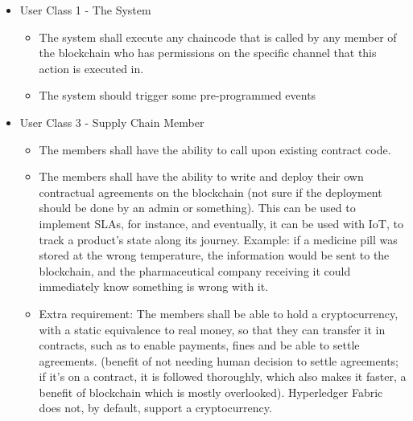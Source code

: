     \begin{itemize}
        \item User Class 1 - The System
            \begin{itemize}
			\item The system shall execute any chaincode that is called by any member of the blockchain who has permissions on the specific channel that this action is executed in.
            \item The system should trigger some pre-programmed events
            \end{itemize}
        \item User Class 3 - Supply Chain Member
            \begin{itemize}
			\item The members shall have the ability to call upon existing contract code.
			\item The members shall have the ability to write  and deploy their own contractual agreements on the blockchain (not sure if the deployment should be done by an admin or something). This can be used to implement SLAs, for instance, and eventually, it can be used with IoT, to track a product's state along its journey. Example: if a medicine pill was stored at the wrong temperature, the information would be sent to the blockchain, and the pharmaceutical company receiving it could immediately know something is wrong with it.
			
            \item Extra requirement: The members shall be able to hold a cryptocurrency, with a static equivalence to real money, so that they can transfer it in contracts, such as to enable payments, fines and be able to settle agreements. (benefit of not needing human decision to settle agreements; if it's on a contract, it is followed thoroughly, which also makes it faster, a benefit of blockchain which is mostly overlooked). Hyperledger Fabric does not, by default, support a cryptocurrency.
            \end{itemize}
    \end{itemize}


